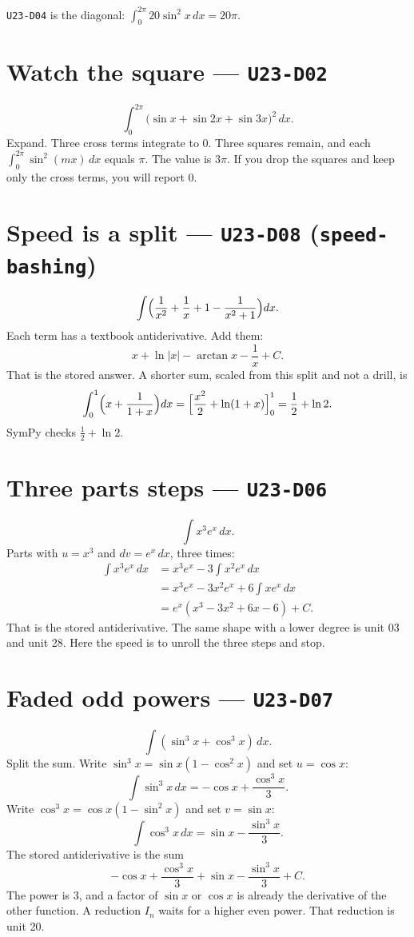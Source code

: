 \texttt{U23-D04} is the diagonal: $\int_0^{2\pi}20\sin^2 x\,dx=20\pi$.

\section{Watch the square --- \texttt{U23-D02}}
\[
\int_0^{2\pi}\bigl(\sin x+\sin 2x+\sin 3x\bigr)^2\,dx.
\]
Expand. Three cross terms integrate to 0. Three squares remain, and each $\int_0^{2\pi}\sin^2(mx)\,dx$ equals $\pi$. The value is $3\pi$. If you drop the squares and keep only the cross terms, you will report 0.

\section{Speed is a split --- \texttt{U23-D08} (\texttt{speed-bashing})}
\[
\int\Bigl(\frac{1}{x^2}+\frac{1}{x}+1-\frac{1}{x^2+1}\Bigr)dx.
\]
Each term has a textbook antiderivative. Add them:
\[
x+\ln|x|-\arctan x-\frac{1}{x}+C.
\]
That is the stored answer. A shorter sum, scaled from this split and not a drill, is
\[
\int_0^1\Bigl(x+\frac{1}{1+x}\Bigr)dx=\Bigl[\frac{x^2}{2}+\ln(1+x)\Bigr]_0^1=\frac12+\ln 2.
\]
SymPy checks $\frac12+\ln 2$.

\section{Three parts steps --- \texttt{U23-D06}}
\[
\int x^3 e^x\,dx.
\]
Parts with $u=x^3$ and $dv=e^x\,dx$, three times:
\begin{align*}
\int x^3 e^x\,dx
&= x^3 e^x-3\int x^2 e^x\,dx\\
&= x^3 e^x-3x^2 e^x+6\int x e^x\,dx\\
&= e^x(x^3-3x^2+6x-6)+C.
\end{align*}
That is the stored antiderivative. The same shape with a lower degree is unit 03 and unit 28. Here the speed is to unroll the three steps and stop.

\section{Faded odd powers --- \texttt{U23-D07}}
\[
\int(\sin^3 x+\cos^3 x)\,dx.
\]
Split the sum. Write $\sin^3 x=\sin x(1-\cos^2 x)$ and set $u=\cos x$:
\[
\int\sin^3 x\,dx=-\cos x+\frac{\cos^3 x}{3}.
\]
Write $\cos^3 x=\cos x(1-\sin^2 x)$ and set $v=\sin x$:
\[
\int\cos^3 x\,dx=\sin x-\frac{\sin^3 x}{3}.
\]
The stored antiderivative is the sum
\[
-\cos x+\frac{\cos^3 x}{3}+\sin x-\frac{\sin^3 x}{3}+C.
\]
The power is 3, and a factor of $\sin x$ or $\cos x$ is already the derivative of the other function. A reduction $I_n$ waits for a higher even power. That reduction is unit 20.

